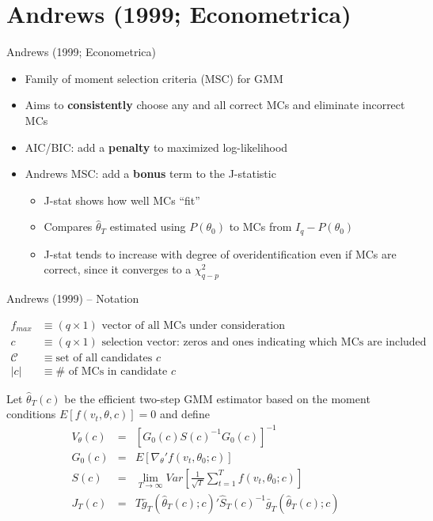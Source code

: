 \section{Andrews (1999; Econometrica)}
\begin{frame}{Andrews (1999; Econometrica)}
  \begin{itemize}
    \item Family of moment selection criteria (MSC) for GMM
    \item Aims to \textbf{consistently} choose any and all correct MCs and eliminate incorrect MCs
    \item AIC/BIC: add a \textbf{penalty} to maximized log-likelihood
    \item Andrews MSC: add a \textbf{bonus} term to the J-statistic
      \begin{itemize}
        \item J-stat shows how well MCs ``fit''
        \item Compares $\widehat{\theta}_T$ estimated using $P(\theta_0)$ to MCs from $I_q - P(\theta_0)$
        \item J-stat tends to increase with degree of overidentification even if MCs are correct, since it converges to a $\chi^2_{q-p}$
      \end{itemize}
  \end{itemize}
  
\end{frame}
\begin{frame}{Andrews (1999) -- Notation}

  \vspace{-1em}
  \footnotesize
  \begin{align*}
    f_{max} &\equiv (q\times 1)\mbox{ vector of all MCs under consideration}\\
    c &\equiv (q\times 1) \mbox{ selection vector: zeros and ones indicating which MCs are included}\\
    \mathcal{C} &\equiv \mbox{set of all candidates } c\\
    |c| &\equiv \# \mbox{ of MCs in candidate } c
  \end{align*}

Let $\widehat{\theta}_T(c)$ be the efficient two-step GMM estimator based on the moment conditions $E[f(v_t,\theta, c)]=0$ and define
\begin{eqnarray*}
 	V_\theta(c) &=& \left[G_0(c) S(c)^{-1} G_0(c) \right]^{-1}\\
 	G_0(c) &=& E[\nabla_\theta' f(v_t, \theta_0; c)]\\
 	S(c) &=& \lim_{T\rightarrow\infty} Var\left[\frac{1}{\sqrt{T}}\sum_{t=1}^T f(v_t, \theta_0;c)\right]\\
 	J_T(c) &=& T \bar{g}_T\left(\widehat{\theta}_T(c);c\right)'\widehat{S}_T(c)^{-1}\bar{g}_T\left(\widehat{\theta}_T(c);c\right)
 \end{eqnarray*}
\end{frame}
